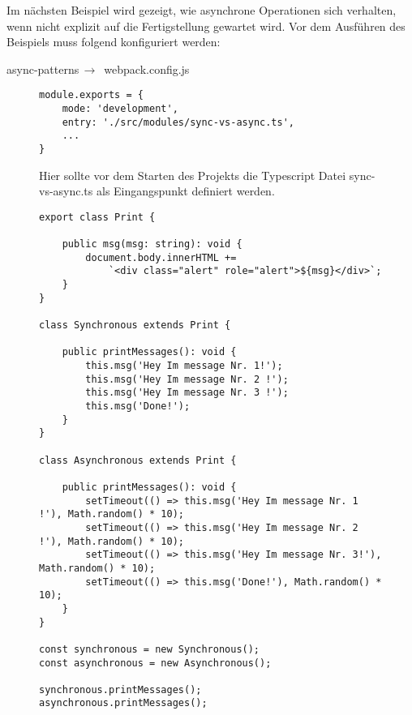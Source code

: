 Im nächsten Beispiel wird gezeigt, wie asynchrone Operationen sich verhalten, wenn nicht explizit auf die Fertigstellung gewartet wird. Vor dem Ausführen des Beispiels muss folgend konfiguriert werden:

\begin{center}
    async-patterns$\,\to\,$ webpack.config.js
\end{center}

\begin{figure}[H]
\begin{lstlisting}[basicstyle=\small]
module.exports = {
    mode: 'development',
    entry: './src/modules/sync-vs-async.ts',
    ...
}
\end{lstlisting}
\caption{Hier sollte vor dem Starten des Projekts die Typescript Datei sync-vs-async.ts als Eingangspunkt definiert werden.}
\end{figure}

\begin{figure}[H]
\begin{lstlisting}[basicstyle=\small]
export class Print {

    public msg(msg: string): void {
        document.body.innerHTML +=
            `<div class="alert" role="alert">${msg}</div>`;
    }
}

class Synchronous extends Print {

    public printMessages(): void {
        this.msg('Hey Im message Nr. 1!');
        this.msg('Hey Im message Nr. 2 !');
        this.msg('Hey Im message Nr. 3 !');
        this.msg('Done!');
    }
}

class Asynchronous extends Print {

    public printMessages(): void {
        setTimeout(() => this.msg('Hey Im message Nr. 1 !'), Math.random() * 10);
        setTimeout(() => this.msg('Hey Im message Nr. 2 !'), Math.random() * 10);
        setTimeout(() => this.msg('Hey Im message Nr. 3!'), Math.random() * 10);
        setTimeout(() => this.msg('Done!'), Math.random() * 10);
    }
}

const synchronous = new Synchronous();
const asynchronous = new Asynchronous();

synchronous.printMessages();
asynchronous.printMessages();
\end{lstlisting}
\end{figure}

